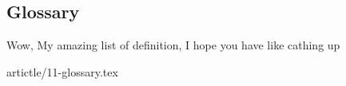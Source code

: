 \subsection{Glossary}
Wow, My amazing list of definition, I hope you have like cathing up

artictle/11-glossary.tex
